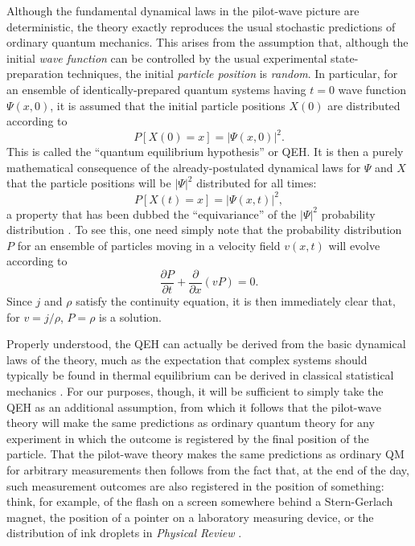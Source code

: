\documentclass[aps,prc,onecolumn,letterpaper,floatfix,12pt]{revtex4}
\begin{document}
Although the fundamental dynamical laws in the
pilot-wave picture are deterministic, the theory exactly reproduces
the usual stochastic predictions of ordinary quantum mechanics.  This
arises from the assumption that, although the initial \emph{wave function}
can be controlled by the usual experimental state-preparation
techniques, the initial \emph{particle position} is \emph{random}.  In
particular, for an ensemble of identically-prepared quantum systems
having $t=0$ wave function $\Psi(x,0)$, it is assumed that the
initial particle positions $X(0)$ are distributed according to
\begin{equation}
P[X(0)\!=\!x] = |\Psi(x,0)|^2.
\label{QEH}
\end{equation}
This is called the ``quantum equilibrium hypothesis'' or QEH.
It is then a purely mathematical consequence of the already-postulated
dynamical laws for $\Psi$ and $X$ that the particle positions will
be $|\Psi|^2$ distributed for all times:
\begin{equation}
P[X(t) \!= \! x] = |\Psi(x,t)|^2,
\label{equiv}
\end{equation}
a property that has been dubbed the ``equivariance'' of the $|\Psi|^2$
probability distribution \cite{dgz}. 
To see this, one need simply note that the probability distribution $P$
for an ensemble of particles moving in a velocity field $v(x,t)$
will evolve according to
\begin{equation}
\frac{\partial P}{\partial t} + \frac{\partial}{\partial x} ( v P ) = 0.
\end{equation}
Since $j$ and $\rho$ satisfy the continuity equation, 
it is then immediately clear that, for $v = j / \rho$, $P = \rho$ is a
solution.

Properly understood, the QEH can actually be derived from the basic
dynamical laws of the theory, much as the expectation that complex
systems should typically be found in thermal equilibrium can be
derived in classical statistical mechanics \cite{dgz2}.  For our purposes, though,
it will be sufficient to  simply take the QEH as
an additional assumption, from which it follows that the
pilot-wave theory will make the same predictions as ordinary quantum
theory for any experiment in which the outcome is registered by the
final position of the particle.  That the pilot-wave theory makes the
same predictions as ordinary QM for arbitrary measurements then
follows from the fact that, at the end of the day, such measurement
outcomes are also registered in the position of something:  think, for
example, of the flash on a screen somewhere behind a Stern-Gerlach
magnet, the position of a pointer on a laboratory measuring device, or
the distribution of ink droplets in \emph{Physical Review} \cite{bellqft}. 
\end{document}
